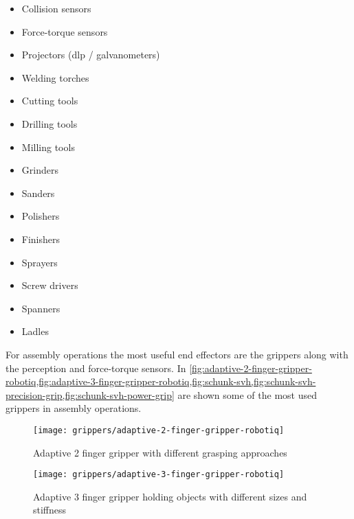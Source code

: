 \begin{itemize}
\begin{itemize}
		\item Point / line lasers
		\item \glspl{lidar}
		\item RGB-D sensors
		\item Structured light sensors
	\end{itemize}
	\item Collision sensors
	\item Force-torque sensors
	\item Projectors (\gls{dlp} / galvanometers)
	\item Welding torches
	\item Cutting tools
	\item Drilling tools
	\item Milling tools
	\item Grinders
	\item Sanders
	\item Polishers
	\item Finishers
	\item Sprayers
	\item Screw drivers
	\item Spanners
	\item Ladles
\end{itemize}


For assembly operations the most useful end effectors are the grippers along with the perception and force-torque sensors. In \cref{fig:adaptive-2-finger-gripper-robotiq,fig:adaptive-3-finger-gripper-robotiq,fig:schunk-svh,fig:schunk-svh-precision-grip,fig:schunk-svh-power-grip} are shown some of the most used grippers in assembly operations.

\begin{figure}[H]
	\centering
	\texttt{[image: grippers/adaptive-2-finger-gripper-robotiq]}
	\caption{Adaptive 2 finger gripper with different grasping approaches\protect\footnotemark}
	\label{fig:adaptive-2-finger-gripper-robotiq}
\end{figure}

\begin{figure}[H]
	\centering
	\texttt{[image: grippers/adaptive-3-finger-gripper-robotiq]}
	\caption{Adaptive 3 finger gripper holding objects with different sizes and stiffness\protect\footnotemark}
	\label{fig:adaptive-3-finger-gripper-robotiq}
\end{figure}

